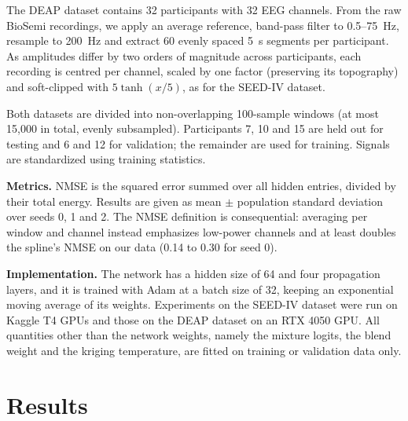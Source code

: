 \documentclass{article}
\begin{document}
The DEAP dataset \cite{koelstra2012deap} contains 32 participants with 32 EEG
channels. From the raw BioSemi recordings, we apply an average reference,
band-pass filter to 0.5--75~Hz, resample to 200~Hz and extract 60 evenly
spaced 5~s segments per participant. As amplitudes differ by two orders
of magnitude across participants, each recording is centred per channel,
scaled by one factor (preserving its topography) and soft-clipped with
$5\tanh(x/5)$, as for the SEED-IV dataset.

Both datasets are divided into non-overlapping 100-sample windows (at most
15{,}000 in total, evenly subsampled). Participants 7, 10 and 15 are held out for testing and 6 and 12
for validation; the remainder are used for training. Signals are
standardized using training statistics.

\textbf{Metrics.} NMSE is the squared error summed over all hidden entries,
divided by their total energy. Results are given as mean $\pm$
population standard deviation over seeds 0, 1 and 2. The NMSE definition
is consequential: averaging per window and channel instead emphasizes
low-power channels and at least doubles the spline's NMSE on our data
(0.14 to 0.30 for seed 0).

\textbf{Implementation.} The network has a hidden size of 64 and four
propagation layers, and it is trained with Adam at a batch size of 32,
keeping an exponential moving average of its weights. Experiments on the
SEED-IV dataset were run on Kaggle T4 GPUs and those on the DEAP dataset
on an RTX 4050 GPU. All quantities other than the network weights, namely
the mixture logits, the blend weight and the kriging temperature, are
fitted on training or validation data only.

\section{Results}
\label{sec:results}
\end{document}
